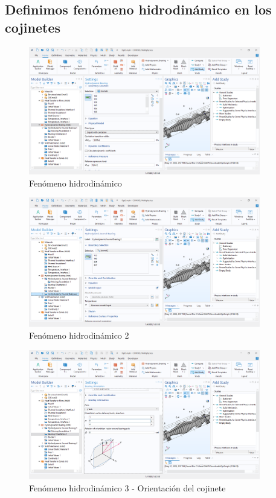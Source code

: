 \documentclass{article}
\theoremstyle{mytheoremstyle}
\theoremstyle{mytheoremstyle}
\theoremstyle{myproblemstyle}
\begin{document}
             \subsection{Definimos fenómeno hidrodinámico en los cojinetes}
            \begin{figure}[H]
              \centering
              \includegraphics[width=0.9\textwidth]{fen4.png}
              \caption{Fenómeno hidrodinámico}
              \label{fig:comsol_fen_hidrodinamico_1} %
            \end{figure}

             \begin{figure}[H]
              \centering
              \includegraphics[width=0.9\textwidth]{fen5.png}
              \caption{Fenómeno hidrodinámico 2}
              \label{fig:comsol_fen_hidrodinamico_2} %
            \end{figure}

             \begin{figure}[H]
              \centering
              \includegraphics[width=0.9\textwidth]{ori.png}
              \caption{Fenómeno hidrodinámico 3 - Orientación del cojinete}
              \label{fig:comsol_fen_hidrodinamico_orientacion} %
            \end{figure}
\end{document}

